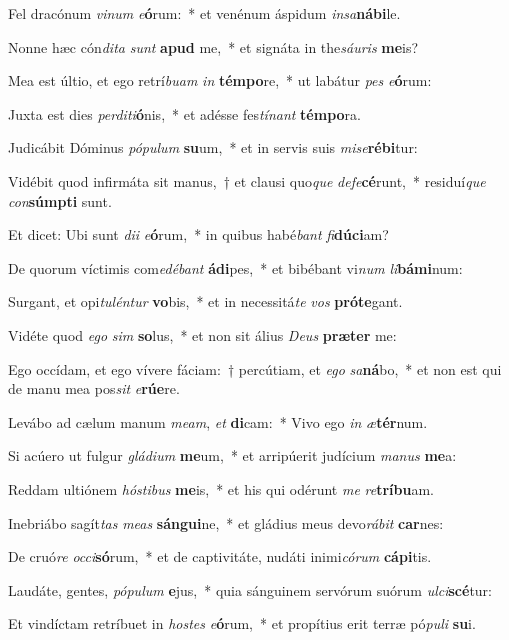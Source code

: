 \item Fel dracónum \textit{vi}\textit{num} \textit{e}\textbf{ó}rum:~* et venénum áspidum \textit{in}\textit{sa}\textbf{ná}\textbf{bi}le.
\item Nonne hæc cón\textit{di}\textit{ta} \textit{sunt} \textbf{a}\textbf{pud} me,~* et signáta in the\textit{sáu}\textit{ris} \textbf{me}is?
\item Mea est últio, et ego retrí\textit{bu}\textit{am} \textit{in} \textbf{tém}\textbf{po}re,~* ut labátur \textit{pes} \textit{e}\textbf{ó}rum:
\item Juxta est dies \textit{per}\textit{di}\textit{ti}\textbf{ó}nis,~* et adésse fes\textit{tí}\textit{nant} \textbf{tém}\textbf{po}ra.
\item Judicábit Dóminus \textit{pó}\textit{pu}\textit{lum} \textbf{su}um,~* et in servis suis \textit{mi}\textit{se}\textbf{ré}\textbf{bi}tur:
\item Vidébit quod infirmáta sit manus,~† et clausi quo\textit{que} \textit{de}\textit{fe}\textbf{cé}runt,~* residuí\textit{que} \textit{con}\textbf{súmp}\textbf{ti} sunt.
\item Et dicet: Ubi sunt \textit{di}\textit{i} \textit{e}\textbf{ó}rum,~* in quibus habé\textit{bant} \textit{fi}\textbf{dú}\textbf{ci}am?
\item De quorum víctimis com\textit{e}\textit{dé}\textit{bant} \textbf{á}\textbf{di}pes,~* et bibébant vi\textit{num} \textit{li}\textbf{bá}\textbf{mi}num:
\item Surgant, et opi\textit{tu}\textit{lén}\textit{tur} \textbf{vo}bis,~* et in necessitá\textit{te} \textit{vos} \textbf{pró}\textbf{te}gant.
\item Vidéte quod \textit{e}\textit{go} \textit{sim} \textbf{so}lus,~* et non sit álius \textit{De}\textit{us} \textbf{præ}\textbf{ter} me:
\item Ego occídam, et ego vívere fáciam:~† percútiam, et \textit{e}\textit{go} \textit{sa}\textbf{ná}bo,~* et non est qui de manu mea pos\textit{sit} \textit{e}\textbf{rú}\textbf{e}re.
\item Levábo ad cælum manum \textit{me}\textit{am}, \textit{et} \textbf{di}cam:~* Vivo ego \textit{in} \textit{æ}\textbf{tér}num.
\item Si acúero ut fulgur \textit{glá}\textit{di}\textit{um} \textbf{me}um,~* et arripúerit judícium \textit{ma}\textit{nus} \textbf{me}a:
\item Reddam ultiónem \textit{hós}\textit{ti}\textit{bus} \textbf{me}is,~* et his qui odérunt \textit{me} \textit{re}\textbf{trí}\textbf{bu}am.
\item Inebriábo sagít\textit{tas} \textit{me}\textit{as} \textbf{sán}\textbf{gui}ne,~* et gládius meus devo\textit{rá}\textit{bit} \textbf{car}nes:
\item De cruó\textit{re} \textit{oc}\textit{ci}\textbf{só}rum,~* et de captivitáte, nudáti inimi\textit{có}\textit{rum} \textbf{cá}\textbf{pi}tis.
\item Laudáte, gentes, \textit{pó}\textit{pu}\textit{lum} \textbf{e}jus,~* quia sánguinem servórum suórum \textit{ul}\textit{ci}\textbf{scé}tur:
\item Et vindíctam retríbuet in \textit{hos}\textit{tes} \textit{e}\textbf{ó}rum,~* et propítius erit terræ pó\textit{pu}\textit{li} \textbf{su}i.

